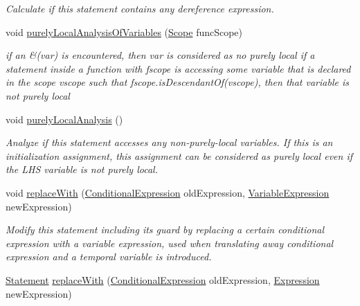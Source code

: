 \begin{DoxyCompactItemize}
\begin{DoxyCompactList}\small\item\em Calculate if this statement contains any dereference expression. \end{DoxyCompactList}\item 
void \hyperlink{classedu_1_1udel_1_1cis_1_1vsl_1_1civl_1_1model_1_1common_1_1statement_1_1CommonAssignStatement_aca8a6dd10293847b179279496d61bf83}{purely\+Local\+Analysis\+Of\+Variables} (\hyperlink{interfaceedu_1_1udel_1_1cis_1_1vsl_1_1civl_1_1model_1_1IF_1_1Scope}{Scope} func\+Scope)
\begin{DoxyCompactList}\small\item\em if an \&(var) is encountered, then var is considered as no purely local if a statement inside a function with fscope is accessing some variable that is declared in the scope vscope such that fscope.\+is\+Descendant\+Of(vscope), then that variable is not purely local \end{DoxyCompactList}\item 
void \hyperlink{classedu_1_1udel_1_1cis_1_1vsl_1_1civl_1_1model_1_1common_1_1statement_1_1CommonAssignStatement_a902a50cc803d8d9a373b445296ab0f55}{purely\+Local\+Analysis} ()
\begin{DoxyCompactList}\small\item\em Analyze if this statement accesses any non-\/purely-\/local variables. If this is an initialization assignment, this assignment can be considered as purely local even if the L\+H\+S variable is not purely local. \end{DoxyCompactList}\item 
void \hyperlink{classedu_1_1udel_1_1cis_1_1vsl_1_1civl_1_1model_1_1common_1_1statement_1_1CommonAssignStatement_a18926fbb79d98128381f514aea009534}{replace\+With} (\hyperlink{interfaceedu_1_1udel_1_1cis_1_1vsl_1_1civl_1_1model_1_1IF_1_1expression_1_1ConditionalExpression}{Conditional\+Expression} old\+Expression, \hyperlink{interfaceedu_1_1udel_1_1cis_1_1vsl_1_1civl_1_1model_1_1IF_1_1expression_1_1VariableExpression}{Variable\+Expression} new\+Expression)
\begin{DoxyCompactList}\small\item\em Modify this statement including its guard by replacing a certain conditional expression with a variable expression, used when translating away conditional expression and a temporal variable is introduced. \end{DoxyCompactList}\item 
\hyperlink{interfaceedu_1_1udel_1_1cis_1_1vsl_1_1civl_1_1model_1_1IF_1_1statement_1_1Statement}{Statement} \hyperlink{classedu_1_1udel_1_1cis_1_1vsl_1_1civl_1_1model_1_1common_1_1statement_1_1CommonAssignStatement_a0ce97b22dc32f26695c0f61c35866804}{replace\+With} (\hyperlink{interfaceedu_1_1udel_1_1cis_1_1vsl_1_1civl_1_1model_1_1IF_1_1expression_1_1ConditionalExpression}{Conditional\+Expression} old\+Expression, \hyperlink{interfaceedu_1_1udel_1_1cis_1_1vsl_1_1civl_1_1model_1_1IF_1_1expression_1_1Expression}{Expression} new\+Expression)

\end{DoxyCompactItemize}
